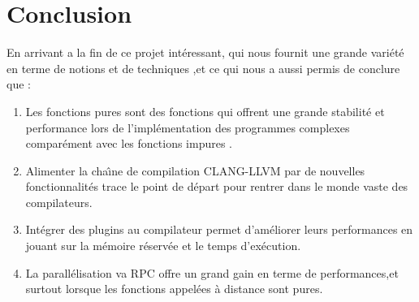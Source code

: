 \documentclass[12pt,a4paper]{article}
\begin{document}
\pagebreak

\section{Conclusion}







En arrivant a la fin de ce projet intéressant, qui nous fournit une grande variété en terme de notions et de techniques ,et ce qui nous a aussi permis de conclure que :

\begin{enumerate}
    \item Les fonctions pures sont des fonctions qui offrent une grande stabilité et performance lors de l'implémentation des programmes complexes comparément avec les fonctions impures .
    
    \item Alimenter la chaı̂ne de compilation CLANG-LLVM par de nouvelles fonctionnalités trace le point de départ pour rentrer dans le monde vaste des compilateurs.
    
    \item Intégrer des plugins au compilateur permet d’améliorer leurs performances en jouant sur la mémoire réservée et le temps d’exécution.
    
    \item La parallélisation va RPC offre un grand gain en terme de performances,et surtout lorsque les fonctions appelées à distance sont pures.
    
  \end{enumerate}  



\pagebreak 

\nocite{*} 



\end{document}
